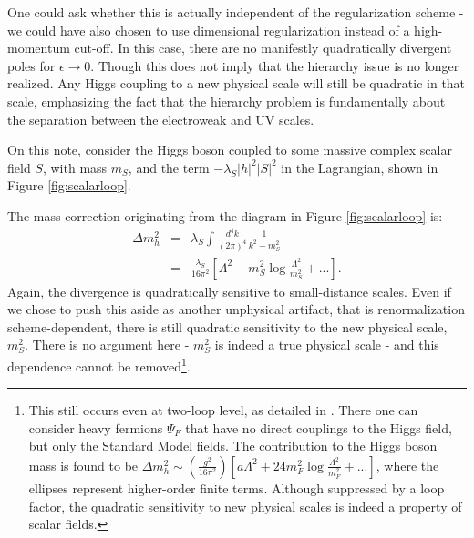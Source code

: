 \begin{itemize}
One could ask whether this is actually independent of the regularization scheme - we could have also chosen to use dimensional regularization instead of a high-momentum cut-off. In this case, there are no manifestly quadratically divergent poles for $\epsilon \rightarrow 0$. Though this does not imply that the hierarchy issue is no longer realized. Any Higgs coupling to a new physical scale will still be quadratic in that scale, emphasizing the fact that the hierarchy problem is fundamentally about the separation between the electroweak and UV scales.

On this note, consider the Higgs boson coupled to some massive complex scalar field $S$, with mass $m_S$, and the term $-\lambda_{S}|h|^2|S|^2$ in the Lagrangian, shown in Figure \ref{fig:scalarloop}.
\begin{center}
\vspace{5mm}
\label{fig:scalarloop}
\end{center}
The mass correction originating from the diagram in Figure \ref{fig:scalarloop} is:
\begin{eqnarray}
\Delta m^2_{h}&=&\lambda_{S}\int{\frac{d^{4}k}{(2\pi)^4} \frac{1}{k^2-m_{S}^2}} \nonumber \\
&=&\frac{\lambda_{S}}{16\pi^2}\left[ \Lambda^2-m_{S}^2 \log \frac{\Lambda^2}{m_{S}^2}+... \right].
\end{eqnarray}
Again, the divergence is quadratically sensitive to small-distance scales. Even if we chose to push this aside as another unphysical artifact, that is renormalization scheme-dependent, there is still quadratic sensitivity to the new physical scale, $m^2_{S}$. There is no argument here - $m^2_{S}$ is indeed a true physical scale - and this dependence cannot be removed\footnote{This still occurs even at two-loop level, as detailed in \cite{RN516}. There one can consider heavy fermions $\Psi_{F}$ that have no direct couplings to the Higgs field, but only the Standard Model fields. The contribution to the Higgs boson mass is found to be $\Delta m^2_{h} \sim \left(\frac{g^2}{16 \pi^2}\right) \left[ a\Lambda^2+24m^2_{F}\log\frac{\Lambda^2}{m^2_F}+...\right]$, where the ellipses represent higher-order finite terms. Although suppressed by a loop factor, the quadratic sensitivity to new physical scales is indeed a property of scalar fields.}.


\end{itemize}
